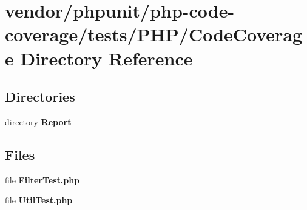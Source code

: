\section{vendor/phpunit/php-\/code-\/coverage/tests/\+P\+H\+P/\+Code\+Coverage Directory Reference}
\label{dir_9b8b26314de7ad2bb377875b1876b21a}
\subsection*{Directories}
\begin{DoxyCompactItemize}
\item 
directory {\bf Report}
\end{DoxyCompactItemize}
\subsection*{Files}
\begin{DoxyCompactItemize}
\item 
file {\bf Filter\+Test.\+php}
\item 
file {\bf Util\+Test.\+php}
\end{DoxyCompactItemize}
